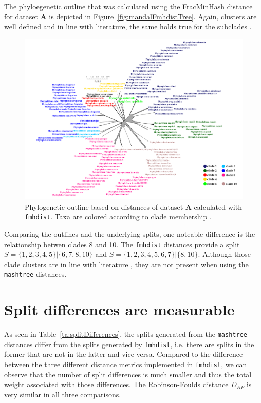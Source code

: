 The phyloegenetic outline that was calculated using the FracMinHash distance for
dataset \textbf{A} is depicted in Figure~\ref{fig:mandalFmhdistTree}. Again,
clusters are well defined and in line with literature, the same holds true for
the subclades
\cite{abadPhytophthoraTaxonomicPhylogenetic2023a,yangExpandedPhylogenyGenus2017}.

\begin{figure}
  \centering
  \includegraphics[width=1.0\textwidth]{figures/fmhdist_mandal_outline_k21_s2000.png}
  \caption[Phylogenetic outline based on distances of dataset \textbf{A}
  calculated with \texttt{fmhdist}]{Phylogenetic outline based on distances of
  dataset \textbf{A} calculated with \texttt{fmhdist}. Taxa are colored according to
  clade membership \cite{abadPhytophthoraTaxonomicPhylogenetic2023a}.}
  \label{fig:mandalFmhdistOutline}
\end{figure}

Comparing the outlines and the underlying splits, one noteable difference is the
relationship betwen clades 8 and 10. The \texttt{fmhdist} distances provide a
split $S= \{1, 2, 3, 4, 5\} | \{6, 7, 8, 10\}$ and $S= \{1, 2, 3, 4, 5, 6, 7\} |
\{8, 10\}$. Although those clade clusters are in line with literature
\cite{yangExpandedPhylogenyGenus2017,abadPhytophthoraTaxonomicPhylogenetic2023a},
they are not present when using the \texttt{mashtree} distances.


\section{Split differences are measurable}
As seen in Table~\ref{ta:splitDifferences}, the splits generated from the
\texttt{mashtree} distances differ from the splits generated by
\texttt{fmhdist}, i.e. there are splits in the former that are not in the latter
and vice versa. Compared to the difference between the three different distance
metrics implemented in \texttt{fmhdist}, we can observe that the number of
split differences is much smaller and thus the total weight associated with
those differences. The Robinson-Foulds distance $D_{RF}$ is very similar in all
three comparisons.

